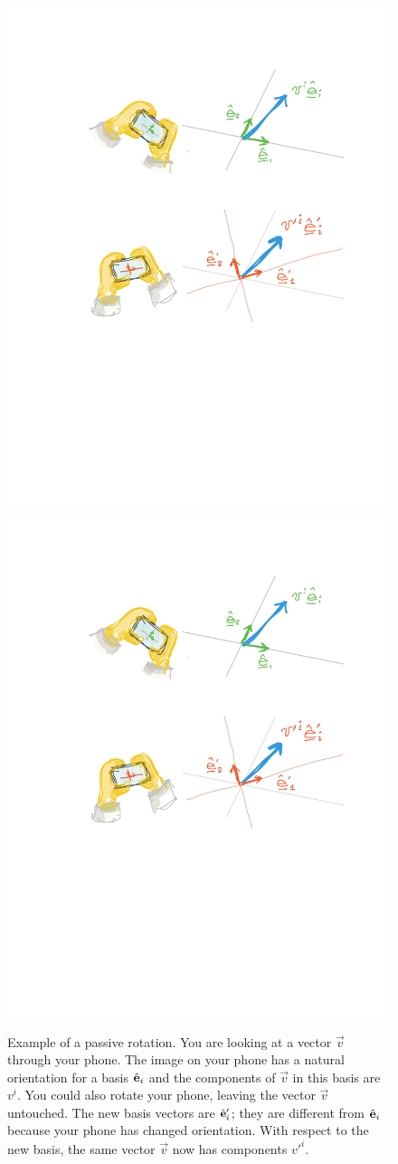 \documentclass[12pt, oneside]{report}    %
\begin{document}
\begin{figure}[tb]
    \centering
    \includegraphics[width=.43\textwidth]{figures/rotate_1.pdf}
    \quad\quad
    \includegraphics[width=.43\textwidth]{figures/rotate_2.pdf}
    \caption{Example of a passive rotation. You are looking at a vector $\vec{v}$ through your phone. The image on your phone has a natural orientation for a basis $\hat{\mathbf{e}}_i$ and the components of $\vec{v}$ in this basis are $v^i$. You could also rotate your phone, leaving the vector $\vec{v}$ untouched. The new basis vectors are $\hat{\mathbf{e}}_i'$; they are different from $\hat{\mathbf{e}}_i$ because your phone has changed orientation. With respect to the new basis, the same vector $\vec{v}$ now has components $v'^i$.}
    \label{fig:passive:rotation}
\end{figure}
\end{document}
